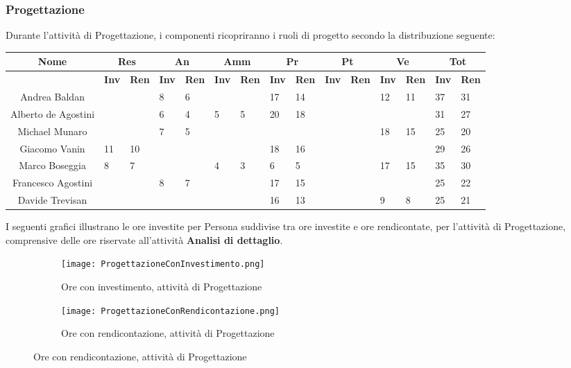 \documentclass{scalatekids-article}
\begin{document}
\subsubsection{Progettazione}
Durante l'attività di Progettazione, i componenti ricopriranno i ruoli di progetto secondo la distribuzione seguente:
\begin{center}
  \scriptsize
  \begin{tabular}{| c | p{0.35cm}  p{0.35cm} | p{0.35cm}  p{0.35cm} | p{0.35cm}  p{0.35cm} | p{0.35cm}  p{0.35cm} | p{0.35cm}  p{0.35cm} | p{0.35cm}  p{0.35cm} | p{0.35cm}  p{0.35cm} |}
    \hline
    \textbf{Nome} & \multicolumn{2}{|c|}{\textbf{Res}} & \multicolumn{2}{|c|}{\textbf{An}} & \multicolumn{2}{|c|}{\textbf{Amm}} & \multicolumn{2}{|c|}{\textbf{Pr}} & \multicolumn{2}{|c|}{\textbf{Pt}} & \multicolumn{2}{|c|}{\textbf{Ve}} & \multicolumn{2}{|c|}{\textbf{Tot}}\\
    \hline
    & \textbf{Inv} & \textbf{Ren} & \textbf{Inv} & \textbf{Ren} & \textbf{Inv} & \textbf{Ren} & \textbf{Inv} & \textbf{Ren} & \textbf{Inv} & \textbf{Ren} & \textbf{Inv} & \textbf{Ren} & \textbf{Inv} & \textbf{Ren}\\
    \hline
    Andrea Baldan & & & 8 & 6 & & & 17 & 14 & & & 12 & 11 & 37 & 31\\
    Alberto de Agostini & & & 6 & 4 & 5 & 5 & 20 & 18 & & & & & 31 & 27\\
    Michael Munaro & & & 7 & 5 & & & & & & & 18 & 15 & 25 & 20\\
    Giacomo Vanin & 11 & 10 & & & & & 18 & 16 & & & & & 29 & 26\\
    Marco Boseggia & 8 & 7 & & & 4 & 3 & 6 & 5 & & & 17 & 15 & 35 & 30\\
    Francesco Agostini & & & 8 & 7 & & & 17 & 15 & & & & & 25 & 22\\
    Davide Trevisan & & & & & & & 16 & 13 & & & 9 & 8 & 25 & 21\\
    \hline
  \end{tabular}
\end{center}
I seguenti grafici illustrano le ore investite per Persona suddivise tra ore
investite e ore rendicontate, per l'attività di Progettazione, comprensive delle
ore riservate all'attività \textbf{Analisi di dettaglio}.
\begin{figure}[H]
  \begin{subfigure}[H]{0.47\textwidth}
    \texttt{[image: ProgettazioneConInvestimento.png]}
    \caption{Ore con investimento, attività di Progettazione}
  \end{subfigure}
  \qquad
  \begin{subfigure}[H]{0.47\textwidth}
    \texttt{[image: ProgettazioneConRendicontazione.png]}
    \caption{Ore con rendicontazione, attività di Progettazione}
  \end{subfigure}
\end{figure}
\end{document}
